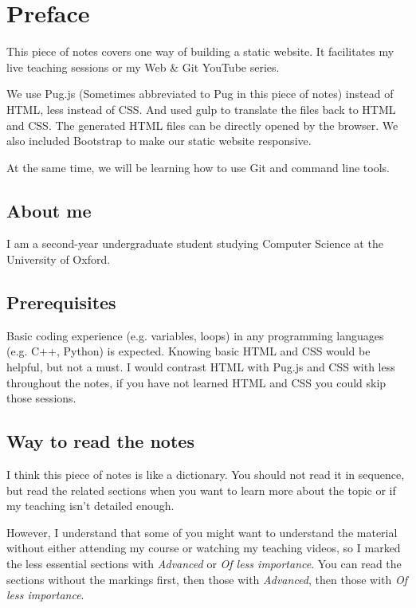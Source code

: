 \chapter*{Preface}

This piece of notes covers one way of building a static website. It facilitates my live teaching sessions or my Web \& Git YouTube series.
\vspace{6mm}

We use Pug.js (Sometimes abbreviated to Pug in this piece of notes) instead of HTML, less instead of CSS. And used gulp to translate the files back to HTML and CSS. The generated HTML files can be directly opened by the browser. We also included Bootstrap to make our static website responsive.

At the same time, we will be learning how to use Git and command line tools.

\section{About me}

I am a second-year undergraduate student studying Computer Science at the University of Oxford.

\section{Prerequisites}

Basic coding experience (e.g. variables, loops) in any programming languages (e.g. C++, Python) is expected. Knowing basic HTML and CSS would be helpful, but not a must. I would contrast HTML with Pug.js and CSS with less throughout the notes, if you have not learned HTML and CSS you could skip those sessions.

\section{Way to read the notes}

I think this piece of notes is like a dictionary. You should not read it in sequence, but read the related sections when you want to learn more about the topic or if my teaching isn't detailed enough. 
\vspace{6mm}

However, I understand that some of you might want to understand the material without either attending my course or watching my teaching videos, so I marked the less essential sections with \textit{Advanced} or \textit{Of less importance}. You can read the sections without the markings first, then those with \textit{Advanced}, then those with \textit{Of less importance}.

